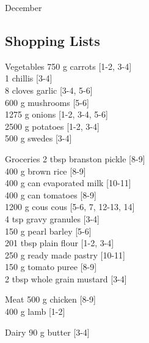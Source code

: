 \begin{menu}{December}
    \subsection*{Shopping Lists}
      \begin{shoppinglist}{Vegetables}
      750 g carrots {\scriptsize[1-2, 3-4]}\\
      1  chillis {\scriptsize[3-4]}\\
      8 cloves garlic {\scriptsize[3-4, 5-6]}\\
      600 g mushrooms {\scriptsize[5-6]}\\
      1275 g onions {\scriptsize[1-2, 3-4, 5-6]}\\
      2500 g potatoes {\scriptsize[1-2, 3-4]}\\
      500 g swedes {\scriptsize[3-4]}\\
      \end{shoppinglist}%
      \begin{shoppinglist}{Groceries}
      2 tbsp branston pickle {\scriptsize[8-9]}\\
      400 g brown rice {\scriptsize[8-9]}\\
      400 g can evaporated milk {\scriptsize[10-11]}\\
      400 g can tomatoes {\scriptsize[8-9]}\\
      1200 g cous cous {\scriptsize[5-6, 7, 12-13, 14]}\\
      4 tsp gravy granules {\scriptsize[3-4]}\\
      150 g pearl barley {\scriptsize[5-6]}\\
      201 tbsp plain flour {\scriptsize[1-2, 3-4]}\\
      250 g ready made pastry {\scriptsize[10-11]}\\
      150 g tomato puree {\scriptsize[8-9]}\\
      2 tbsp whole grain mustard {\scriptsize[3-4]}\\
      \end{shoppinglist}%
      \par\vfil %
      \begin{shoppinglist}{Meat}
      500 g chicken {\scriptsize[8-9]}\\
      400 g lamb {\scriptsize[1-2]}\\
      \end{shoppinglist}%
      \begin{shoppinglist}{Dairy}
      90 g butter {\scriptsize[3-4]}\\

\end{shoppinglist}
\end{menu}
